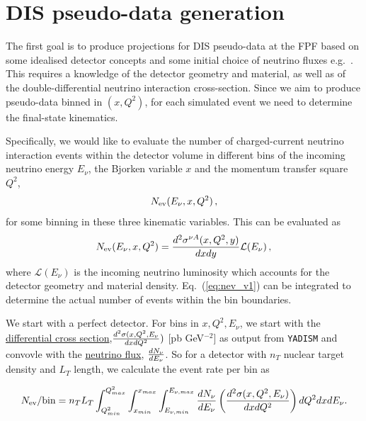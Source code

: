 \documentclass[11pt,a4paper]{article}
\def\frac#1#2{{{#1}\over {#2}}}
\numberwithin{equation}{section}
\numberwithin{figure}{section}
\numberwithin{table}{section}
\begin{document}
\section{DIS pseudo-data generation}
\label{sec:pseudo-data_generation}

The first goal is to produce projections
for DIS pseudo-data at the FPF based on
some idealised detector concepts and
some initial choice of neutrino fluxes
e.g.~\cite{Kling:2021gos}.
%
This requires a knowledge of the detector geometry
and material, as well as of the double-differential
neutrino interaction cross-section. 
%
Since we aim to produce pseudo-data binned in $(x,Q^2)$,
for each simulated event we need to determine the 
final-state kinematics. 

Specifically, we would like to evaluate the
number of charged-current neutrino interaction events
within the detector volume in different bins
of the incoming neutrino energy $E_\nu$, the Bjorken
variable $x$ and the momentum transfer square $Q^2$,
\begin{equation}
    N_{\rm ev}(E_\nu, x, Q^2) \, ,
\end{equation}
for some binning in these three kinematic variables.
%
This can be evaluated as
\begin{equation}
\label{eq:nev_v1}
    N_{\rm ev}(E_\nu, x, Q^2) =  \frac{d^2\sigma^{\nu A}(x,Q^2,y)}{dxdy} \mathcal{L}(E_{\nu}) \, ,
\end{equation}
where $\mathcal{L}(E_{\nu}) $ is the incoming neutrino
luminosity which accounts for the detector geometry
and material density. 
%
Eq.~(\ref{eq:nev_v1}) can be integrated to
determine the actual number of events within
the bin boundaries.

\newline
\newline
We start with a perfect detector.
\newline
\newline
For bins in $x,Q^2,E_{\nu}$, we start with the \href{https://github.com/juanrojochacon/FPF-WG1/blob/main/results/diff_xsecs_a1.txt}{differential cross section},$\frac{d^2\sigma(x,Q^2,E_{\nu}}{dxdQ^2})$ [pb GeV$^{-2}$] as output from {\tt YADISM} and convovle with the \href{https://github.com/KlingFelix/FastNeutrinoFluxSimulation/tree/main/Fluxes}{neutrino flux}, $\frac{dN_{\nu}}{dE_{\nu}}$. So for a detector with $n_T$ nuclear target density and $L_T$ length, we calculate the event rate per bin as

\begin{equation}
    N_{\rm ev}/{\rm bin} = n_T L_T\int_{Q^2_{min}}^{Q^2_{max}}\int_{x_{min}}^{x_{max}}\int_{E_{\nu,min}}^{E_{\nu , max}} \frac{dN_{\nu}}{dE_{\nu}}\left(\frac{d^2\sigma(x,Q^2,E_{\nu})}{dxdQ^2}\right) dQ^2 dx dE_{\nu}.
\end{equation}
\end{document}
